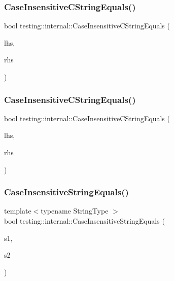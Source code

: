 \subsubsection{\texorpdfstring{Case\+Insensitive\+C\+String\+Equals()}{CaseInsensitiveCStringEquals()}\hspace{0.1cm}{\footnotesize\ttfamily [1/2]}}
{\footnotesize\ttfamily bool testing\+::internal\+::\+Case\+Insensitive\+C\+String\+Equals (\begin{DoxyParamCaption}\item[{const char $\ast$}]{lhs,  }\item[{const char $\ast$}]{rhs }\end{DoxyParamCaption})\hspace{0.3cm}{\ttfamily [inline]}}

\mbox{\label{namespacetesting_1_1internal_ad5b31f61a3cc5b4226d3560f5b48f4dd}} 
\subsubsection{\texorpdfstring{Case\+Insensitive\+C\+String\+Equals()}{CaseInsensitiveCStringEquals()}\hspace{0.1cm}{\footnotesize\ttfamily [2/2]}}
{\footnotesize\ttfamily bool testing\+::internal\+::\+Case\+Insensitive\+C\+String\+Equals (\begin{DoxyParamCaption}\item[{const wchar\+\_\+t $\ast$}]{lhs,  }\item[{const wchar\+\_\+t $\ast$}]{rhs }\end{DoxyParamCaption})\hspace{0.3cm}{\ttfamily [inline]}}

\mbox{\label{namespacetesting_1_1internal_a383de24b1cca6648c14b03964c0ed843}} 
\subsubsection{\texorpdfstring{Case\+Insensitive\+String\+Equals()}{CaseInsensitiveStringEquals()}}
{\footnotesize\ttfamily template$<$typename String\+Type $>$ \\
bool testing\+::internal\+::\+Case\+Insensitive\+String\+Equals (\begin{DoxyParamCaption}\item[{const String\+Type \&}]{s1,  }\item[{const String\+Type \&}]{s2 }\end{DoxyParamCaption})}

